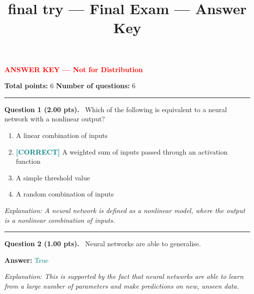 \documentclass[12pt,a4paper]{article}
\title{final try — Final Exam --- Answer Key}
\date{}
\begin{document}
\maketitle

{\large \textbf{\textcolor{red}{ANSWER KEY --- Not for Distribution}}}

\vspace{0.5em}



\noindent
\textbf{Total points:} 6
\hfill
\textbf{Number of questions:} 6

\vspace{1em}
\hrule
\vspace{1.5em}


\noindent
\textbf{Question 1 (2.00 pts).}~
Which of the following is equivalent to a neural network with a nonlinear output?


\begin{enumerate}[label=\textbf{\Alph*.}]

  \item A linear combination of inputs

  \item \textbf{\textcolor{teal}{[CORRECT]}}  A weighted sum of inputs passed through an activation function

  \item A simple threshold value

  \item A random combination of inputs

\end{enumerate}



\textit{\small Explanation: A neural network is defined as a nonlinear model, where the output is a nonlinear combination of inputs.}



\vspace{0.8em}
\noindent\rule{\linewidth}{0.2pt}
\vspace{0.3em}


\noindent
\textbf{Question 2 (1.00 pts).}~
Neural networks are able to generalise.


\textbf{Answer:} \textcolor{teal}{True}



\textit{\small Explanation: This is supported by the fact that neural networks are able to learn from a large number of parameters and make predictions on new, unseen data.}
\end{document}
